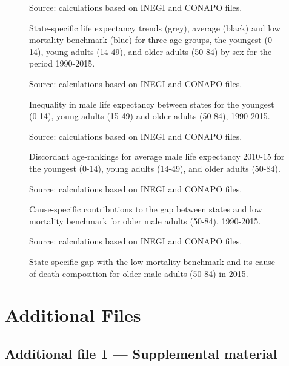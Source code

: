 \documentclass{bmcart}
\begin{document}
\begin{backmatter}
\begin{figure}[h!]
\centering
\caption{State-specific life expectancy trends (grey), average (black) and low mortality benchmark (blue) for three age groups, the youngest (0-14), young adults (14-49), and older adults (50-84) by sex for the period 1990-2015.}
\label{Fig1}

Source: calculations based on INEGI and CONAPO files. 
\end{figure}



\begin{figure}[h!]
\centering
\caption{Inequality in male life expectancy between states for the youngest (0-14), young adults (15-49) and older adults (50-84), 1990-2015.}
\label{Fig2}

Source: calculations based on INEGI and CONAPO files. 
\end{figure}

\begin{figure}[h!]
\centering
\caption{Discordant age-rankings for average male life expectancy 2010-15 for the youngest (0-14), young adults (14-49), and older adults (50-84).}
\label{Fig3}
Source: calculations based on INEGI and CONAPO files. 
\end{figure}



\begin{figure}[h!]
\centering
\caption{Cause-specific contributions to the gap between states and low mortality benchmark for older male adults (50-84), 1990-2015.}
\label{Fig4}

Source: calculations based on INEGI and CONAPO files. 
\end{figure}


\begin{figure}[h!]
\centering
\caption{State-specific gap with the low mortality benchmark and its cause-of-death composition for older male adults (50-84) in 2015.}

\label{Fig5}

Source: calculations based on INEGI and CONAPO files. 
\end{figure}




\section*{Additional Files}
  \subsection*{Additional file 1 --- Supplemental material}

\end{backmatter}
\end{document}
